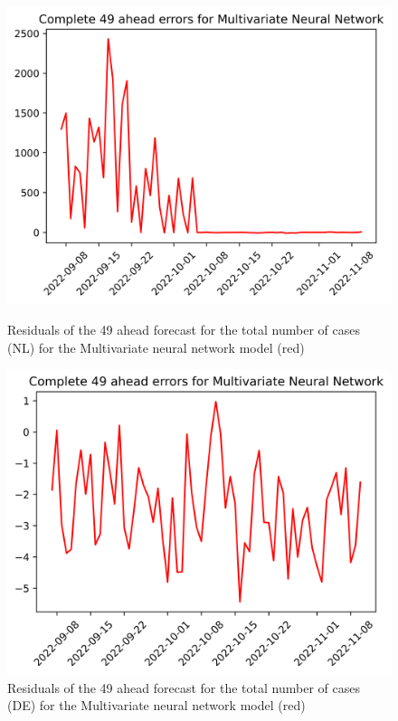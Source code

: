 \begin{figure}

\begin{minipage}{.45\textwidth}
  \centering
  \includegraphics[width=\linewidth]{pics/49_ah/49_ahead_errors_Multivariate Neural Network.png}
  \caption{Residuals of the 49 ahead forecast for the total number of cases (NL) for the Multivariate neural network model (red)}
  \label{fig:tot_cases_error_49_mvnn}
\end{minipage}
\begin{minipage}{.45\textwidth}
  \centering
  \includegraphics[width=\linewidth]{pics/49_ah/DE_49_ahead_errors_Multivariate Neural Network.png}
  \caption{Residuals of the 49 ahead forecast for the total number of cases (DE) for the Multivariate neural network model (red)}
  \label{fig:tot_cases_error_49_mvnn_DE}
\end{minipage}

\end{figure}
